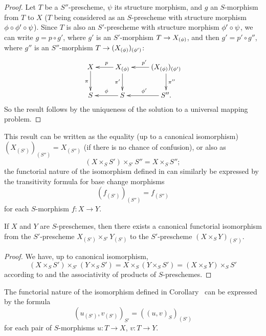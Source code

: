 \begin{proof}
\label{proof-1.3.3.9}
Let $T$ be a $S''$-prescheme, $\psi$ its structure morphism, and $g$ an
$S$-morphism from $T$ to $X$ ($T$ being considered as an $S$-prescheme with
structure morphism $\phi\circ\phi'\circ\psi$). Since $T$ is also an $S'$-prescheme
with structure morphism $\phi'\circ\psi$, we can write $g=p\circ g'$, where
$g'$ is an $S'$-morphism $T\to X_{(\vphi)}$, and then $g'=p'\circ g''$, where
$g''$ is an $S''$-morphism $T\to(X_{(\vphi)})_{(\vphi')}$:
\[
  \xymatrix{
    X\ar[d]_\pi &
    X_{(\vphi)}\ar[l]_p\ar[d]_{\pi'} &
    (X_{(\vphi)})_{(\vphi')}\ar[l]_{p'}\ar[d]^{\pi''}\\
    S &
    S\ar[l]_\vphi &
    S''\ar[l]_{\vphi'}.
  }
\]
So the result follows by the uniqueness of the solution to a universal
mapping problem.
\end{proof}

This result can be written as the equality (up to a canonical isomorphism)
$(X_{(S')})_{(S'')}=X_{(S'')}$ (if there is no chance of confusion), or also as
\begin{equation*}
\label{1.3.3.9.1}
  (X\times_S S')\times_{S'}S''=X\times_S S'';
  \tag{3.3.9.1}
\end{equation*}
the functorial nature of the isomorphism defined in  can
similarly be expressed by the transitivity formula for base change morphisms
\begin{equation*}
\label{1.3.3.9.2}
  (f_{(S')})_{(S'')}=f_{(S'')}
  \tag{3.3.9.2}
\end{equation*}
for each $S$-morphism $f:X\to Y$.

\begin{cor}[3.3.10]
\label{1.3.3.10}
If $X$ and $Y$ are $S$-preschemes, then there exists a canonical functorial
isomorphism from the $S'$-prescheme $X_{(S')}\times_{S'}Y_{(S')}$ to the
$S'$-prescheme $(X\times_S Y)_{(S')}$.
\end{cor}

\begin{proof}
\label{proof-1.3.3.10}
We have, up to canonical isomorphism,
\[
  (X\times_S S')\times_{S'}(Y\times_S S')
  =X\times_S(Y\times_S S')=(X\times_S Y)\times_S S'
\]
according to  and the associativity of products of $S$-preschemes.
\end{proof}

The functorial nature of the isomorphism defined in
Corollary~ can be expressed by the formula
\begin{equation*}
\label{1.3.3.10.1}
  (u_{(S')},v_{(S')})_{S'}=((u,v)_S)_{(S')}
  \tag{3.3.10.1}
\end{equation*}
for each pair of $S$-morphisms $u:T\to X$, $v:T\to Y$.

